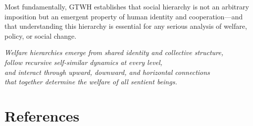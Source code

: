 \documentclass[12pt,a4paper]{article}
\begin{document}
Most fundamentally, GTWH establishes that social hierarchy is not an 
arbitrary imposition but an emergent property of human identity and 
cooperation---and that understanding this hierarchy is essential for 
any serious analysis of welfare, policy, or social change.

\begin{tcolorbox}[colback=gray!5!white, colframe=gray!75!black, title=The GTWH in One Sentence]
\centering
\textit{Welfare hierarchies emerge from shared identity and collective structure, \\
follow recursive self-similar dynamics at every level, \\
and interact through upward, downward, and horizontal connections \\
that together determine the welfare of all sentient beings.}
\end{tcolorbox}


\newpage
\section*{References}
\end{document}
